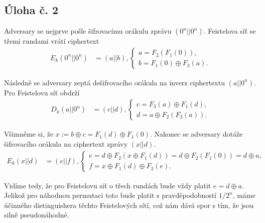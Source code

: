 \documentclass{scrartcl}
\DeclareMathOperator{\xor}{\oplus}
\begin{document}
\subsection*{Úloha č. 2}
Adversary se nejprve pošle šifrovacímu orákulu zprávu $(0^n||0^n)$. Feistelova síť se třemi rundami vrátí ciphertext
\begin{align*}
    E_k(0^n||0^n) &= (a||b), \begin{cases}
        a = F_2(F_1(0)), \\
        b = F_1(0) \xor F_3(a).
    \end{cases} 
\end{align*} 

Následně se adversary zeptá dešifrovacího orákula na inverz ciphertextu $(a||0^n)$. Pro Feistelovu síť obdrží
\begin{align*}
    D_k(a||0^n) &= (c||d), \begin{cases}
        c = F_3(a) \xor F_1(d), \\
        d = a \xor F_2(F_3(a)).
    \end{cases}
\end{align*}

Všimněme si, že $x := b \xor c = F_1(d) \xor F_1(0)$. Nakonec se adversary dotáže šifrovacího orákula na ciphertext zprávy $(x||d)$.
\begin{align*}
    E_k(x||d) &= (e||f), \begin{cases}
        e = d \xor F_2(x\xor F_1(d)) = d \xor F_2(F_1(0)) = d\xor a, \\
        f = x \xor F_1(d) \xor F_3(e).
    \end{cases}
\end{align*}

Vidíme tedy, že pro Feistelovu síť o třech rundách bude vždy platit $e = d\xor a$. Jelikož pro náhodnou permutaci toto bude platit s pravděpodobností $1/2^n$, máme účinného distinguishera těchto Feistelových sítí, což nám dává spor s tím, že jsou silně pseudonáhodné.
\end{document}
